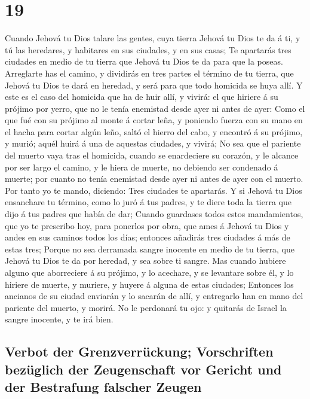 \hypertarget{section-18}{%
\section{19}\label{section-18}}

 Cuando Jehová tu Dios talare las gentes, cuya tierra Jehová
tu Dios te da á ti, y tú las heredares, y habitares en sus ciudades, y
en sus casas;  Te apartarás tres ciudades en medio de tu
tierra que Jehová tu Dios te da para que la poseas. 
Arreglarte has el camino, y dividirás en tres partes el término de tu
tierra, que Jehová tu Dios te dará en heredad, y será para que todo
homicida se huya allí.  Y este es el caso del homicida que
ha de huir allí, y vivirá: el que hiriere á su prójimo por yerro, que no
le tenía enemistad desde ayer ni antes de ayer:  Como el que
fué con su prójimo al monte á cortar leña, y poniendo fuerza con su mano
en el hacha para cortar algún leño, saltó el hierro del cabo, y encontró
á su prójimo, y murió; aquél huirá á una de aquestas ciudades, y vivirá;
 No sea que el pariente del muerto vaya tras el homicida,
cuando se enardeciere su corazón, y le alcance por ser largo el camino,
y le hiera de muerte, no debiendo ser condenado á muerte; por cuanto no
tenía enemistad desde ayer ni antes de ayer con el muerto. 
Por tanto yo te mando, diciendo: Tres ciudades te apartarás.
 Y si Jehová tu Dios ensanchare tu término, como lo juró á
tus padres, y te diere toda la tierra que dijo á tus padres que había de
dar;  Cuando guardases todos estos mandamientos, que yo te
prescribo hoy, para ponerlos por obra, que ames á Jehová tu Dios y andes
en sus caminos todos los días; entonces añadirás tres ciudades á más de
estas tres;  Porque no sea derramada sangre inocente en
medio de tu tierra, que Jehová tu Dios te da por heredad, y sea sobre ti
sangre.  Mas cuando hubiere alguno que aborreciere á su
prójimo, y lo acechare, y se levantare sobre él, y lo hiriere de muerte,
y muriere, y huyere á alguna de estas ciudades;  Entonces
los ancianos de su ciudad enviarán y lo sacarán de allí, y entregarlo
han en mano del pariente del muerto, y morirá.  No le
perdonará tu ojo: y quitarás de Israel la sangre inocente, y te irá
bien.

\hypertarget{verbot-der-grenzverruxfcckung-vorschriften-bezuxfcglich-der-zeugenschaft-vor-gericht-und-der-bestrafung-falscher-zeugen}{%
\subsection{Verbot der Grenzverrückung; Vorschriften bezüglich der
Zeugenschaft vor Gericht und der Bestrafung falscher
Zeugen}\label{verbot-der-grenzverruxfcckung-vorschriften-bezuxfcglich-der-zeugenschaft-vor-gericht-und-der-bestrafung-falscher-zeugen}}

